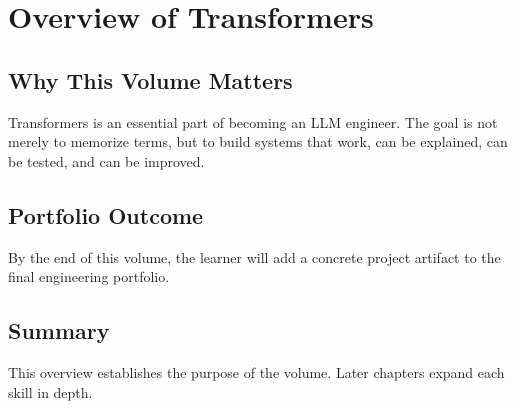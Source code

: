 
\chapter{Overview of Transformers}
\label{chap:volume09-overview}



\section{Why This Volume Matters}

Transformers is an essential part of becoming an LLM engineer. The goal is not merely to memorize terms, but to build systems that work, can be explained, can be tested, and can be improved.

\section{Portfolio Outcome}

By the end of this volume, the learner will add a concrete project artifact to the final engineering portfolio.

\section{Summary}

This overview establishes the purpose of the volume. Later chapters expand each skill in depth.
